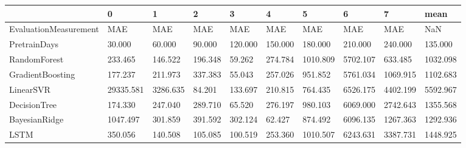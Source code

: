 \begin{tabular}{llllllllll}
\toprule
{} &         0 &        1 &       2 &       3 &       4 &        5 &        6 &        7 &     mean \\
\midrule
EvaluationMeasurement &       MAE &      MAE &     MAE &     MAE &     MAE &      MAE &      MAE &      MAE &      NaN \\
PretrainDays          &    30.000 &   60.000 &  90.000 & 120.000 & 150.000 &  180.000 &  210.000 &  240.000 &  135.000 \\
RandomForest          &   233.465 &  146.522 & 196.348 &  59.262 & 274.784 & 1010.809 & 5702.107 &  633.485 & 1032.098 \\
GradientBoosting      &   177.237 &  211.973 & 337.383 &  55.043 & 257.026 &  951.852 & 5761.034 & 1069.915 & 1102.683 \\
LinearSVR             & 29335.581 & 3286.635 &  84.201 & 133.697 & 210.815 &  764.435 & 6526.175 & 4402.199 & 5592.967 \\
DecisionTree          &   174.330 &  247.040 & 289.710 &  65.520 & 276.197 &  980.103 & 6069.000 & 2742.643 & 1355.568 \\
BayesianRidge         &  1047.497 &  301.859 & 391.592 & 302.124 &  62.427 &  874.492 & 6096.135 & 1267.363 & 1292.936 \\
LSTM                  &   350.056 &  140.508 & 105.085 & 100.519 & 253.360 & 1010.507 & 6243.631 & 3387.731 & 1448.925 \\
\bottomrule
\end{tabular}
